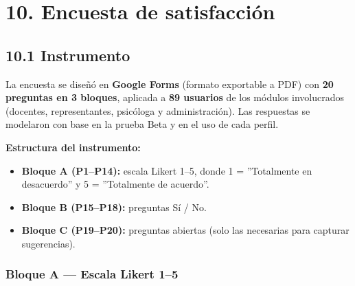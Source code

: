\documentclass[11pt,a4paper]{article}
\begin{document}
\section*{10. Encuesta de satisfacción}


\subsection*{10.1 Instrumento}


La encuesta se diseñó en \textbf{Google Forms} (formato exportable a PDF) con \textbf{20 preguntas en 3 bloques}, aplicada a \textbf{89 usuarios} de los módulos involucrados (docentes, representantes, psicóloga y administración). Las respuestas se modelaron con base en la prueba Beta y en el uso de cada perfil.


\textbf{Estructura del instrumento:}


\begin{itemize}[leftmargin=*]
\item \textbf{Bloque A (P1--P14):} escala Likert 1--5, donde 1 = ''Totalmente en desacuerdo'' y 5 = ''Totalmente de acuerdo''.
\item \textbf{Bloque B (P15--P18):} preguntas Sí / No.
\item \textbf{Bloque C (P19--P20):} preguntas abiertas (solo las necesarias para capturar sugerencias).
\end{itemize}


\subsubsection*{Bloque A --- Escala Likert 1--5}
\end{document}
